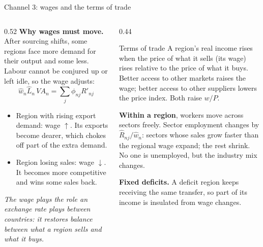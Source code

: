 \documentclass[aspectratio=169,9pt,t]{beamer}
\newcommand{\h}[1]{\hat{#1}}
\newcommand{\up}{{\color{ipgreen}$\uparrow$}}
\newcommand{\dn}{{\color{ipred}$\downarrow$}}
\newcommand{\plain}[1]{{\color{ipgrey}\small\itshape #1}}
\begin{document}
\begin{frame}{Channel 3: wages and the terms of trade}
  \begin{columns}[T]
    \begin{column}{0.52\textwidth}
      \textbf{Why wages must move.} After sourcing shifts, some regions
      face more demand for their output and some less. Labour cannot be
      conjured up or left idle, so the wage adjusts:
      \[ \h w_n\h L_n\,VA_n=\sum_j\phi_{nj}R'_{nj} \]
      \begin{itemize}
        \item Region with rising export demand: wage \up. Its exports
              become dearer, which chokes off part of the extra demand.
        \item Region losing sales: wage \dn. It becomes more competitive
              and wins some sales back.
      \end{itemize}
      \plain{The wage plays the role an exchange rate plays between
      countries: it restores balance between what a region sells and
      what it buys.}
    \end{column}
    \begin{column}{0.44\textwidth}
      \begin{block}{Terms of trade}
        \small A region's real income rises when the price of what it
        sells (its wage) rises relative to the price of what it buys.
        Better access to other markets raises the wage; better access to
        other suppliers lowers the price index. Both raise $w/P$.
      \end{block}
      \small
      \textbf{Within a region}, workers move across sectors freely.
      Sector employment changes by $\h R_{nj}/\h w_n$: sectors whose
      sales grow faster than the regional wage expand; the rest
      shrink. No one is unemployed, but the industry mix changes.

      \smallskip
      \textbf{Fixed deficits.} A deficit region keeps receiving the same
      transfer, so part of its income is insulated from wage changes.
    \end{column}
  \end{columns}
\end{frame}
\end{document}
